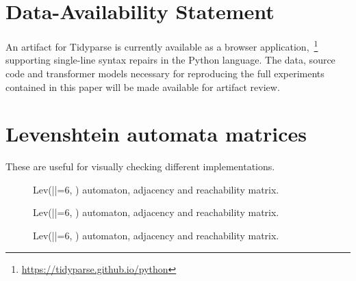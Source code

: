 \documentclass[sigplan,review,acmsmall,nonacm,screen,anonymous]{acmart}\settopmatter{printfolios=false,printccs=false,printacmref=false}
\begin{document}
\section*{Data-Availability Statement}

An artifact for Tidyparse is currently available as a browser application,~\footnote{\url{https://tidyparse.github.io/python}} supporting single-line syntax repairs in the Python language. The data, source code and transformer models necessary for reproducing the full experiments contained in this paper will be made available for artifact review.

\clearpage

\pagebreak\appendix

\section{Levenshtein automata matrices}

These are useful for visually checking different implementations.

\begin{figure}[H]
\begin{center}
\end{center}
\caption{Lev(|\sigma|=6, ) automaton, adjacency and reachability matrix.}
\end{figure}

\begin{figure}[H]
\begin{center}
\end{center}
\caption{Lev(|\sigma|=6, ) automaton, adjacency and reachability matrix.}
\end{figure}

\begin{figure}[H]
\begin{center}
\end{center}
\caption{Lev(|\sigma|=6, ) automaton, adjacency and reachability matrix.}
\end{figure}
\end{document}
